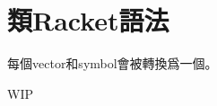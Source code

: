 \documentclass{article}
\newcommand{\sectionNewpage}{}
\newcommand{\postDoc}{}
\newcommand{\Scribtexttt}[1]{{\texttt{#1}}}
\let\SOriginalthesubsection\thesubsection
\newcommand{\Ssection}[2]{\section[#1]{#2}\let\thesubsection\SOriginalthesubsection}
\newcommand{\SColorize}[2]{\color{#1}{#2}}
\newcommand{\SHyphen}[1]{#1}
\newcommand{\inColor}[2]{{\SHyphen{\Scribtexttt{\SColorize{#1}{#2}}}}}
\newcommand{\RktSym}[1]{\inColor{IdentifierColor}{#1}}
\renewcommand{\sectionNewpage}{\newpage}
\begin{document}
\sectionNewpage

\Ssection{類Racket語法}{類Racket語法}\label{t:x28part_x22x985eRacketx8a9ex6cd5x22x29}

每個vector和symbol會被轉換爲一個\RktSym{{\hbox{\texttt{:}}}名}。

WIP

\postDoc
\end{document}
